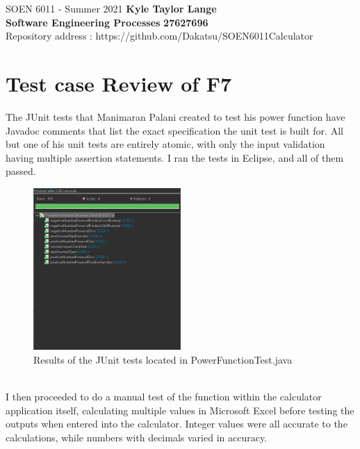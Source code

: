 \documentclass[letterpaper, 11pt]{report}
\begin{document}
\pagebreak

\section*{}
\normalsize {SOEN 6011 - Summer 2021} \hfill \textbf{Kyle Taylor Lange} \\
\textbf{ Software Engineering Processes}  \hfill \textbf{27627696} \\
\hfill Repository address : https://github.com/Dakatsu/SOEN6011Calculator
\\

\section*{Test case Review of F7}
The JUnit tests that Manimaran Palani created to test his power function have Javadoc comments that list the exact specification the unit test is built for. All but one of his unit tests are entirely atomic, with only the input validation having multiple assertion statements. I ran the tests in Eclipse, and all of them passed. \\
\begin{figure}[htb]
\includegraphics[width=0.5\textwidth]{TestF7}
\centering
\caption{Results of the JUnit tests located in PowerFunctionTest.java}
\end{figure} \\
\pagebreak
I then proceeded to do a manual test of the function within the calculator application itself, calculating multiple values in Microsoft Excel before testing the outputs when entered into the calculator. Integer values were all accurate to the calculations, while numbers with decimals varied in accuracy. \\
\end{document}
